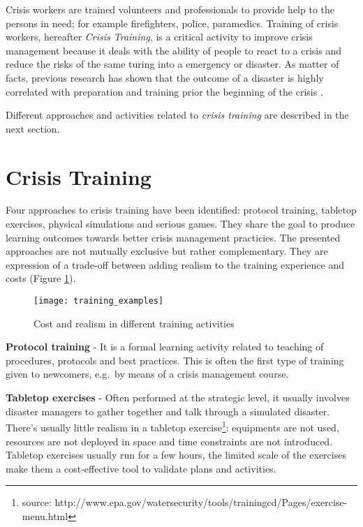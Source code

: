 Crisis workers are trained volunteers and professionals to provide help to the persons in need; for example firefighters, police, paramedics. Training of crisis workers, hereafter \emph{Crisis Training}, is a critical activity to improve crisis management because it deals with the ability of people to react to a crisis and reduce the risks of the same turing into a emergency or disaster. As matter of facts, previous research has shown that the outcome of a disaster is highly correlated with preparation and training prior the beginning of the crisis \autocite{Asproth:cb}.

Different approaches and activities related to \emph{crisis training} are described in the next section.

\section{Crisis Training}\label{crisis-training}

Four approaches to crisis training have been identified: protocol training, tabletop exercises, physical simulations and serious games. They share the goal to produce learning outcomes towards better crisis management practicies. The presented approaches are not mutually exclusive but rather complementary. They are expression of a trade-off between adding realism to the training experience and costs (Figure \ref{fig:training-activities}).

\begin{figure}
	[h!] \centering 
	\texttt{[image: training\_examples]} 
	\caption{Cost and realism in different training activities} 
	\label{fig:training-activities} 
\end{figure}

\textbf{Protocol training} - It is a formal learning activity related to teaching of procedures, protocols and best practices. This is often the first type of training given to newcomers, e.g.~by means of a crisis management course.

\textbf{Tabletop exercises} - Often performed at the strategic level, it usually involves disaster managers to gather together and talk through a simulated disaster. There's usually little realism in a tabletop exercise\footnote{source: http://www.epa.gov/watersecurity/tools/trainingcd/Pages/exercise-menu.html}: equipments are not used, resources are not deployed in space and time constraints are not introduced. Tabletop exercises usually run for a few hours, the limited scale of the exercises make them a cost-effective tool to validate plans and activities.

